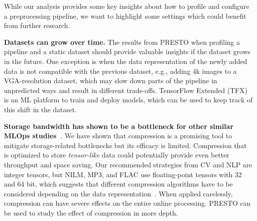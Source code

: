 While our analysis provides some key insights about how to profile and configure a preprocessing pipeline, we want to highlight some settings which could benefit from further research.

\textbf{Datasets can grow over time.}
The results from PRESTO when profiling a pipeline and a static dataset should provide valuable insights if the dataset grows in the future.
One exception is when the data representation of the newly added data is not compatible with the previous dataset, e.g., adding 4k images to a VGA-resolution dataset, which may slow down parts of the pipeline in unpredicted ways and result in different trade-offs.
TensorFlow Extended (TFX)~\cite{10.1145/3097983.3098021} is an ML platform to train and deploy models, which can be used to keep track of this shift in the dataset.

\textbf{Storage bandwidth has shown to be a bottleneck for other similar MLOps studies~\cite{mohan2020analyzing, murray2021tf, kang2020jointly}}.
{\color{diff2}We have shown that compression is a promising tool to mitigate storage-related bottlenecks but its efficacy is limited. Compression that is optimized to store \textit{tensor-like} data could potentially provide even better throughput and space saving.}
Our recommended strategies from CV and NLP are integer tensors, but NILM, MP3, and FLAC use floating-point tensors with 32 and 64 bit, which suggests that different compression algorithms have to be considered depending on the data representation~\cite{lemire2015decoding, fastfpd}.
When applied carelessly, compression can have severe effects on the entire online processing.
PRESTO can be used to study the effect of compression in more depth.


